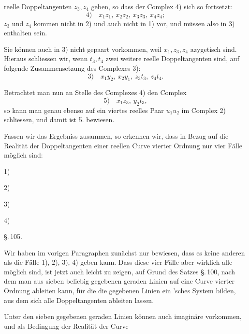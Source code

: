 reelle Doppeltangenten $z_3, z_4$ geben, so dass der Complex 4) sich
so fortsetzt:
\[
4)\quad x_1z_1,\ x_2z_2,\ x_3z_3,\ x_4z_4;
\]
$z_3$ und $z_4$ kommen nicht in 2) und auch nicht in 1) vor, und
müssen also in 3) enthalten sein.

Sie können auch in 3) nicht gepaart vorkommen, weil
$x_1, z_3, z_4$ azygetisch sind. Hieraus schliessen wir, wenn $t_3, t_4$ zwei
weitere reelle Doppeltangenten sind, auf folgende Zusammensetzung
 des Complexes 3):
\[
3)\quad x_1y_2,\ x_2y_1,\ z_3t_3,\ z_4t_4.
\]

Betrachtet man nun an Stelle des Complexes 4) den Complex
\[
5)\quad x_1z_3,\ y_2t_3,
\]
so kann man genau ebenso auf ein viertes reelles Paar $u_1u_2$ im
Complex 2) schliessen, und damit ist 5. bewiesen.

Fassen wir das Ergebniss zusammen, so erkennen wir, dass
in Bezug auf die Realität der Doppeltangenten einer reellen
Curve vierter Ordnung nur vier Fälle möglich sind:

1) 

2) 

3) 

4) 

\begin{center}
\S.\,105.\\
\end{center}

Wir haben im vorigen Paragraphen zunächst nur bewiesen,
dass es keine anderen als die Fälle 1), 2), 3), 4) geben kann.
Dass diese vier Fälle aber wirklich alle möglich sind, ist jetzt
auch leicht zu zeigen, auf Grund des Satzes \S.\,100, nach dem
man aus sieben beliebig gegebenen geraden Linien auf  eine Curve vierter Ordnung ableiten kann, für
die die gegebenen Linien ein 'sches System bilden,
aus dem sich alle Doppeltangenten  ableiten lassen.

Unter den sieben gegebenen geraden Linien können auch
imaginäre vorkommen, und als Bedingung der Realität der Curve
